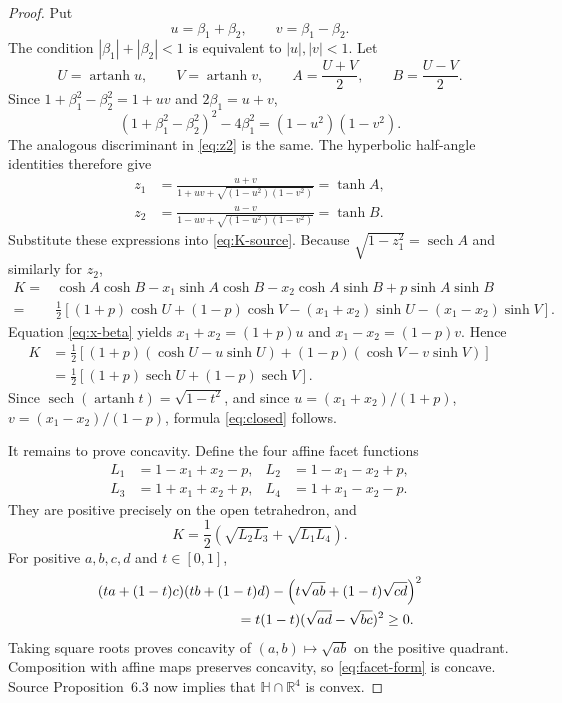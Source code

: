 \documentclass[11pt]{article}
\newcommand{\HH}{\mathbb H}
\newcommand{\R}{\mathbb R}
\begin{document}
\begin{proof}
Put
\[
 u=\beta_1+\beta_2,\qquad v=\beta_1-\beta_2.
\]
The condition \(|\beta_1|+|\beta_2|<1\) is equivalent to
\(|u|,|v|<1\).  Let
\[
 U=\operatorname{artanh}u,\qquad V=\operatorname{artanh}v,
 \qquad A=\frac{U+V}{2},\qquad B=\frac{U-V}{2}.
\]
Since \(1+\beta_1^2-\beta_2^2=1+uv\) and
\(2\beta_1=u+v\),
\[
 (1+\beta_1^2-\beta_2^2)^2-4\beta_1^2
 =(1-u^2)(1-v^2).
\]
The analogous discriminant in \eqref{eq:z2} is the same.  The hyperbolic
half-angle identities therefore give
\begin{align*}
 z_1&=\frac{u+v}{1+uv+\sqrt{(1-u^2)(1-v^2)}}=\tanh A,\\
 z_2&=\frac{u-v}{1-uv+\sqrt{(1-u^2)(1-v^2)}}=\tanh B.
\end{align*}
Substitute these expressions into \eqref{eq:K-source}.  Because
\(\sqrt{1-z_1^2}=\operatorname{sech}A\) and similarly for \(z_2\),
\begin{align*}
K={}&\cosh A\cosh B-x_1\sinh A\cosh B
    -x_2\cosh A\sinh B+p\sinh A\sinh B\\
={}&\frac12\left[(1+p)\cosh U+(1-p)\cosh V
 -(x_1+x_2)\sinh U-(x_1-x_2)\sinh V\right].
\end{align*}
Equation \eqref{eq:x-beta} yields
\(x_1+x_2=(1+p)u\) and \(x_1-x_2=(1-p)v\).  Hence
\begin{align*}
 K
 &=\frac12\left[(1+p)(\cosh U-u\sinh U)
 +(1-p)(\cosh V-v\sinh V)\right]\\
 &=\frac12\left[(1+p)\operatorname{sech}U
 +(1-p)\operatorname{sech}V\right].
\end{align*}
Since \(\operatorname{sech}(\operatorname{artanh}t)=\sqrt{1-t^2}\),
and since \(u=(x_1+x_2)/(1+p)\),
\(v=(x_1-x_2)/(1-p)\), formula \eqref{eq:closed} follows.

It remains to prove concavity.  Define the four affine facet functions
\begin{align*}
 L_1&=1-x_1+x_2-p,& L_2&=1-x_1-x_2+p,\\
 L_3&=1+x_1+x_2+p,& L_4&=1+x_1-x_2-p.
\end{align*}
They are positive precisely on the open tetrahedron, and
\begin{equation}\label{eq:facet-form}
 K=\frac12\left(\sqrt{L_2L_3}+\sqrt{L_1L_4}\right).
\end{equation}
For positive \(a,b,c,d\) and \(t\in[0,1]\),
\begin{align*}
 &(ta+(1-t)c)(tb+(1-t)d)
 -\left(t\sqrt{ab}+(1-t)\sqrt{cd}\right)^2\\
 &\hspace{35mm}=t(1-t)(\sqrt{ad}-\sqrt{bc})^2\ge0.
\end{align*}
Taking square roots proves concavity of \((a,b)\mapsto\sqrt{ab}\) on
the positive quadrant.  Composition with affine maps preserves concavity, so
\eqref{eq:facet-form} is concave.  Source Proposition~6.3 now implies that
\(\HH\cap\R^4\) is convex.
\end{proof}
\end{document}

